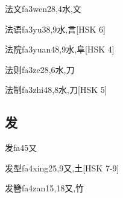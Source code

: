 \begin{EntryWithPhonetic}{法文}{fa3wen2}{8,4}{⽔,⽂}
\end{EntryWithPhonetic}

\begin{EntryWithPhonetic}{法语}{fa3yu3}{8,9}{⽔,⾔}[HSK 6]
\end{EntryWithPhonetic}

\begin{EntryWithPhonetic}{法院}{fa3yuan4}{8,9}{⽔,⾩}[HSK 4]
\end{EntryWithPhonetic}

\begin{EntryWithPhonetic}{法则}{fa3ze2}{8,6}{⽔,⼑}
\end{EntryWithPhonetic}

\begin{EntryWithPhonetic}{法制}{fa3zhi4}{8,8}{⽔,⼑}[HSK 5]
\end{EntryWithPhonetic}

\subsection*{发}

\begin{EntryWithPhonetic}{发}{fa4}{5}{⼜}
\end{EntryWithPhonetic}

\begin{EntryWithPhonetic}{发型}{fa4xing2}{5,9}{⼜,⼟}[HSK 7-9]
\end{EntryWithPhonetic}

\begin{EntryWithPhonetic}{发簪}{fa4zan1}{5,18}{⼜,⽵}
\end{EntryWithPhonetic}

